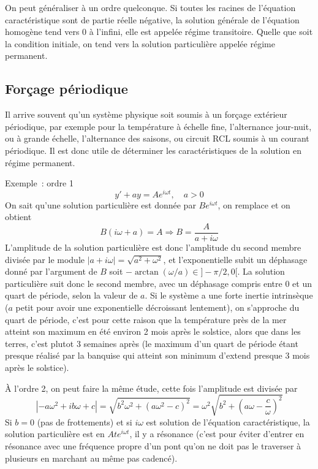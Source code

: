\documentclass[a4paper,11pt]{book}
\begin{document}
\begin{giacjshere}
On peut g\'en\'eraliser \`a un ordre quelconque.
Si toutes les racines de l'\'equation caract\'eristique sont
de partie r\'eelle n\'egative, la solution g\'en\'erale
de l'\'equation homog\`ene tend vers 0 \`a l'infini,
elle est appel\'ee r\'egime transitoire. Quelle que
soit la condition initiale, on tend vers la solution particuli\`ere
appel\'ee r\'egime permanent.

\subsection{For\c{c}age p\'eriodique}
Il arrive souvent qu'un syst\`eme physique soit soumis \`a
un for\c{c}age ext\'erieur p\'eriodique, par exemple
pour la temp\'erature \`a \'echelle fine, l'alternance jour-nuit,
ou \`a grande \'echelle, l'alternance des saisons, ou
circuit RCL soumis \`a un courant p\'eriodique. Il est donc
utile de d\'eterminer les caract\'eristiques de la solution
en r\'egime permanent.

Exemple~: ordre 1
$$ y'+ay=A e^{i\omega t}, \quad a>0$$
On sait qu'une solution particuli\`ere est donn\'ee par
$ B e^{i \omega t}$, on remplace et on obtient
$$ B(i\omega +a)=A \Rightarrow B=\frac{A}{a+i\omega}$$
L'amplitude de la solution particuli\`ere est donc l'amplitude
du second membre divis\'ee par le module 
$|a+i\omega|=\sqrt{a^2+\omega^2}$, et l'exponentielle subit
un d\'ephasage donn\'e par l'argument de $B$ soit
$-\arctan(\omega/a) \in ]-\pi/2,0[$. La solution
particuli\`ere suit donc le second membre, avec un d\'ephasage
compris entre 0 et un quart de p\'eriode, selon la valeur de $a$.
Si le syst\`eme a une forte inertie intrins\`eque ($a$ petit
pour avoir une exponentielle d\'ecroissant lentement), on s'approche
du quart de p\'eriode, c'est pour cette raison que la temp\'erature
pr\`es de la mer atteint son maximum en \'et\'e environ 2 mois
apr\`es le solstice, alors que dans les terres, c'est plutot 3
semaines apr\`es (le maximum d'un quart de p\'eriode
\'etant presque r\'ealis\'e par la banquise qui atteint son
minimum d'extend presque 3 mois apr\`es le solstice).

\`A l'ordre 2, on peut faire la m\^eme \'etude, cette fois l'amplitude
est divis\'ee par
$$|-a\omega^2+ib\omega+c|
=\sqrt{ b^2\omega^2+(a\omega^2-c)^2}
=\omega^2 \sqrt{ b^2+(a\omega-\frac{c}{\omega})^2}$$
Si $b=0$ (pas de frottements) 
et si $i\omega$ est solution de l'\'equation caract\'eristique,
la solution particuli\`ere est en $ A t e^{i\omega t}$,
il y a r\'esonance (c'est pour \'eviter d'entrer en r\'esonance
avec une fr\'equence propre d'un pont qu'on ne doit pas le traverser
\`a plusieurs en marchant au m\^eme pas cadenc\'e).


\end{giacjshere}
\end{document}
